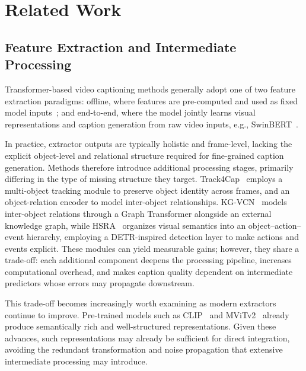 \section{Related Work}
\label{sec:02_rw}

\subsection{Feature Extraction and Intermediate Processing}
\label{subsec:subsec_21_multimodal}
Transformer-based video captioning methods generally adopt one of two feature extraction paradigms: offline, where features are pre-computed and used as fixed model inputs~\cite{yangConceptAwareVideoCaptioning2023, zhongBidirectionalTransformerKnowledge2024}; and end-to-end, where the model jointly learns visual representations and caption generation from raw video inputs, e.g., SwinBERT~\cite{linSwinBERTEndtoEndTransformers2022}.

In practice, extractor outputs are typically holistic and frame-level, lacking the explicit object-level and relational structure required for fine-grained caption generation. Methods therefore introduce additional processing stages, primarily differing in the type of missing structure they target. Track4Cap~\cite{luoFramebyFrameMultiObjectTrackingGuided2025} employs a multi-object tracking module to preserve object identity across frames, and an object-relation encoder to model inter-object relationships. KG-VCN~\cite{yuanFullyExploringObject2025} models inter-object relations through a Graph Transformer alongside an external knowledge graph, while HSRA~\cite{hanActionDrivenSemanticRepresentation2025} organizes visual semantics into an object–action–event hierarchy, employing a DETR-inspired detection layer to make actions and events explicit. These modules can yield measurable gains; however, they share a trade-off: each additional component deepens the processing pipeline, increases computational overhead, and makes caption quality dependent on intermediate predictors whose errors may propagate downstream.

This trade-off becomes increasingly worth examining as modern extractors continue to improve. Pre-trained models such as CLIP~\cite{radfordLearningTransferableVisual2021} and MViTv2~\cite{liMViTv2ImprovedMultiscale2022} already produce semantically rich and well-structured representations. Given these advances, such representations may already be sufficient for direct integration, avoiding the redundant transformation and noise propagation that extensive intermediate processing may introduce.


